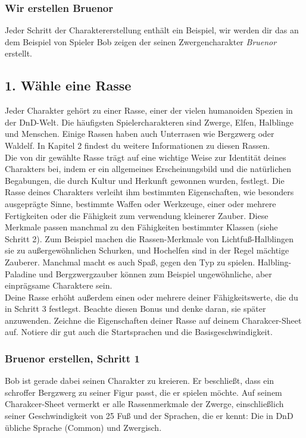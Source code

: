 \subsubsection{Wir erstellen Bruenor}
Jeder Schritt der Charaktererstellung enthält ein Beispiel, wir werden dir das an dem Beispiel von Spieler Bob zeigen der seinen Zwergencharakter \textit{Bruenor} erstellt.

\subsection{1. Wähle eine Rasse}
Jeder Charakter gehört zu einer Rasse, einer der vielen humanoiden Spezien in der DnD-Welt. Die häufigsten Spielercharakteren sind Zwerge, Elfen, Halblinge und Menschen. Einige Rassen haben auch Unterrasen wie Bergzwerg oder Waldelf. In Kapitel 2 findest du weitere Informationen zu diesen Rassen.\\
Die von dir gewählte Rasse trägt auf eine wichtige Weise zur Identität deines Charakters bei, indem er ein allgemeines Erscheinungsbild und die natürlichen Begabungen, die durch Kultur und Herkunft gewonnen wurden, festlegt. Die Rasse deines Charakters verleiht ihm bestimmten Eigenschaften, wie besonders ausgeprägte Sinne, bestimmte Waffen oder Werkzeuge, einer oder mehrere Fertigkeiten oder die Fähigkeit zum verwendung kleinerer Zauber. Diese Merkmale passen manchmal zu den Fähigkeiten bestimmter Klassen (siehe Schritt 2). Zum Beispiel machen die Rassen-Merkmale von Lichtfuß-Halblingen sie zu außergewöhnlichen Schurken, und Hochelfen sind in der Regel mächtige Zauberer. Manchmal macht es auch Spaß, gegen den Typ zu spielen. Halbling-Paladine und Bergzwergzauber können zum Beispiel ungewöhnliche, aber einprägsame Charaktere sein.\\
Deine Rasse erhöht außerdem einen oder mehrere deiner Fähigkeitswerte, die du in Schritt 3 festlegst. Beachte diesen Bonus und denke daran, sie später anzuwenden. Zeichne die Eigenschaften deiner Rasse auf deinem Charakcer-Sheet auf. Notiere dir gut auch die Startsprachen und die Basisgeschwindigkeit.

\subsubsection{Bruenor erstellen, Schritt 1}
Bob ist gerade dabei seinen Charakter zu kreieren. Er beschließt, dass ein schroffer Bergzwerg zu seiner Figur passt, die er spielen möchte. Auf seinem Charakcer-Sheet vermerkt er alle Rassenmerkmale der Zwerge, einschließlich seiner Geschwindigkeit von 25 Fuß und der Sprachen, die er kennt: Die in DnD übliche Sprache (Common) und Zwergisch.


